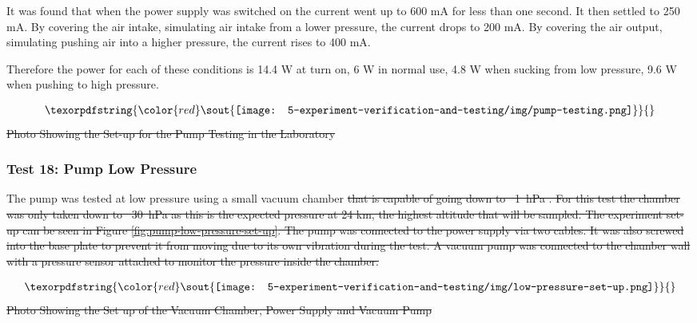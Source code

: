 \documentclass[a4paper,12pt,twoside]{article}
\providecommand{\DIFdeltex}[1]{{\protect\color{red}\sout{#1}}}                      %
\providecommand{\DIFdelbegin}{} %
\providecommand{\DIFdelend}{} %
\providecommand{\DIFdelFL}[1]{\DIFdel{#1}} %
\providecommand{\DIFdel}[1]{\texorpdfstring{\DIFdeltex{#1}}{}} %
\newcommand{\DIFscaledelfig}{0.5}
\newlength{\DIFdelgraphicswidth} %
\newlength{\DIFdelgraphicsheight} %
\newcommand{\DIFdelincludegraphics}[2][]{%
\sbox{\DIFdelgraphicsbox}{\DIFOincludegraphics[#1]{#2}}%
\settoboxwidth{\DIFdelgraphicswidth}{\DIFdelgraphicsbox} %
\settoboxtotalheight{\DIFdelgraphicsheight}{\DIFdelgraphicsbox} %
\scalebox{\DIFscaledelfig}{%
\parbox[b]{\DIFdelgraphicswidth}{\usebox{\DIFdelgraphicsbox}\\[-\baselineskip] \rule{\DIFdelgraphicswidth}{0em}}\llap{\resizebox{\DIFdelgraphicswidth}{\DIFdelgraphicsheight}{%
\setlength{\unitlength}{\DIFdelgraphicswidth}%
\begin{picture}(1,1)%
\thicklines\linethickness{2pt} %
{\color[rgb]{1,0,0}\put(0,0){\framebox(1,1){}}}%
{\color[rgb]{1,0,0}\put(0,0){\line( 1,1){1}}}%
{\color[rgb]{1,0,0}\put(0,1){\line(1,-1){1}}}%
\end{picture}%
}\hspace*{3pt}}} %
} %
\DeclareRobustCommand{\DIFdelbegin}{\DIFOdelbegin \let\includegraphics\DIFdelincludegraphics} %
\DeclareRobustCommand{\DIFdelend}{\DIFOaddend \let\includegraphics\DIFOincludegraphics} %
\begin{document}
It was found that when the power supply was switched on the current went up to 600 mA for less than one second. It then settled to 250 mA. By covering the air intake, simulating air intake from a lower pressure, the current drops to 200 mA. By covering the air output, simulating pushing air into a higher pressure, the current rises to 400 mA.

Therefore the power for each of these conditions is 14.4 W at turn on, 6 W in normal use, 4.8 W when sucking from low pressure, 9.6 W when pushing to high pressure.

\DIFdelbegin %
\begin{align*}
        \DIFdelFL{\texttt{[image: 5-experiment-verification-and-testing/img/pump-testing.png]}
    }\end{align*}
{%
\DIFdelFL{Photo Showing the Set-up for the Pump Testing in the Laboratory}} %

\DIFdelend \subsubsection{Test 18: Pump Low Pressure}\label{subsection:pumplowpressuretest}

The pump was tested at low pressure using a small vacuum chamber \DIFdelbegin \DIFdel{that is capable of going down to \mbox{%
\SI{1}{\hecto\pascal}}\hspace{0pt}%
. For this test the chamber was only taken down to \mbox{%
\SI{30}{\hecto\pascal}}\hspace{0pt}%
as this is the expected pressure at 24 km, the highest altitude that will be sampled. The experiment set-up can be seen in Figure \ref{fig:pump-low-pressure-set-up}. The pump was connected to the power supply via two cables. It was also screwed into the base plate to prevent it from moving due to its own vibration during the test. A vacuum pump was connected to the chamber wall with a pressure sensor attached to monitor the pressure inside the chamber. 
}%

\begin{align*}
        \DIFdelFL{\texttt{[image: 5-experiment-verification-and-testing/img/low-pressure-set-up.png]}
    }\end{align*}
\DIFdelFL{Photo Showing the Set up of the Vacuum Chamber, Power Supply and Vacuum Pump}%
\end{document}
